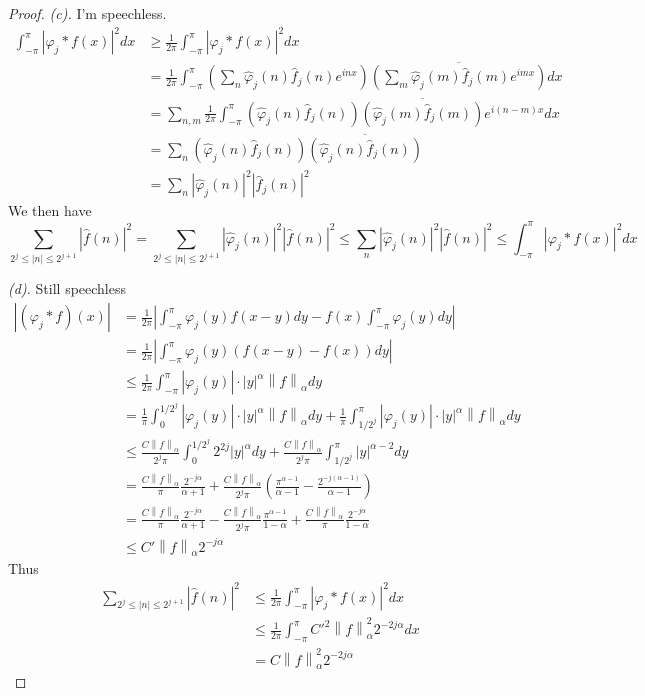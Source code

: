 \documentclass{article}
\newcommand{\norm}[1]{\left\|#1\right\|}
\newcommand{\cj}[1]{\overline{#1}}
\theoremstyle{definition} %
\numberwithin{thm}{section} %
\theoremstyle{definition} %
\begin{document}
\begin{proof}
\textit{(c).} I'm speechless.
\begin{align*}
    \int_{-\pi}^\pi|\varphi_j * f(x)|^2 dx
    &\geq \frac{1}{2\pi}\int_{-\pi}^\pi|\varphi_j * f(x)|^2 dx \\
    &= \frac{1}{2\pi}\int_{-\pi}^\pi
    \left(\sum_n \hat{\varphi}_j(n)\hat{f}_j(n)e^{inx}\right)
    \cj{\left(\sum_m \hat{\varphi}_j(m)\hat{f}_j(m)e^{imx}\right)}dx \\
    &= \sum_{n,m}\frac{1}{2\pi}\int_{-\pi}^\pi
    \left(\hat{\varphi}_j(n)\hat{f}_j(n)\right)
    \cj{\left(\hat{\varphi}_j(m)\hat{f}_j(m)\right)}e^{i(n - m)x}dx \\
    &= \sum_{n}\left(\hat{\varphi}_j(n)\hat{f}_j(n)\right)
    \cj{\left(\hat{\varphi}_j(n)\hat{f}_j(n)\right)} \\
    &= \sum_{n} |\hat{\varphi}_j(n)|^2|\hat{f}_j(n)|^2
\end{align*}
We then have
\[
    \sum_{2^j \leq |n| \leq 2^{j+1}} |\hat{f}(n)|^2 
    = \sum_{2^j \leq |n| \leq 2^{j+1}} 
    |\hat{\varphi}_j(n)|^2|\hat{f}(n)|^2 
    \leq \sum_{n} 
    |\hat{\varphi}_j(n)|^2|\hat{f}(n)|^2 
    \leq \int_{-\pi}^\pi|\varphi_j * f(x)|^2 dx
\]

\textit{(d).} Still speechless
\begin{align*}
    |(\varphi_j * f)(x)| 
    &= \frac{1}{2\pi}\left|\int_{-\pi}^\pi
    \varphi_j(y)f(x - y)dy - f(x)\int_{-\pi}^\pi
    \varphi_j(y)dy\right| \\
    &= \frac{1}{2\pi}\left|\int_{-\pi}^\pi
    \varphi_j(y)(f(x - y) - f(x))dy\right| \\
    &\leq \frac{1}{2\pi}\int_{-\pi}^\pi
    |\varphi_j(y)|\cdot|y|^\alpha\norm{f}_\alpha dy \\
    &= \frac{1}{\pi}\int_{0}^{1/2^j}
    |\varphi_j(y)|\cdot|y|^\alpha\norm{f}_\alpha dy
    + \frac{1}{\pi}\int_{1/2^j}^\pi
    |\varphi_j(y)|\cdot|y|^\alpha\norm{f}_\alpha dy \\
    &\leq \frac{C\norm{f}_\alpha}{2^j\pi}\int_{0}^{1/2^j}
    2^{2j}|y|^\alpha dy
    + \frac{C\norm{f}_\alpha}{2^j\pi}\int_{1/2^j}^\pi
    |y|^{\alpha - 2} dy \\
    &= \frac{C\norm{f}_\alpha}{\pi}
    \frac{2^{-j\alpha}}{\alpha + 1}
    + \frac{C\norm{f}_\alpha}{2^j\pi}
    \left(\frac{\pi^{\alpha - 1}}{\alpha - 1}
    - \frac{2^{-j(\alpha - 1)}}{\alpha - 1}\right) \\
    &= \frac{C\norm{f}_\alpha}{\pi}
    \frac{2^{-j\alpha}}{\alpha + 1}
    - \frac{C\norm{f}_\alpha}{2^j\pi}\frac{\pi^{\alpha - 1}}{1 - \alpha}
    + \frac{C\norm{f}_\alpha}{\pi}\frac{2^{-j\alpha}}{1 - \alpha} \\
    &\leq C'\norm{f}_\alpha 2^{-j\alpha}
\end{align*}
Thus
\begin{align*}
    \sum_{2^j \leq |n| \leq 2^{j+1}} |\hat{f}(n)|^2
    &\leq \frac{1}{2\pi}\int_{-\pi}^\pi|\varphi_j * f(x)|^2 dx \\
    &\leq \frac{1}{2\pi}\int_{-\pi}^\pi
    C'^2\norm{f}^2_\alpha 2^{-2j\alpha} dx \\
    &= C\norm{f}^2_\alpha 2^{-2j\alpha}
\end{align*}


\end{proof}
\end{document}
